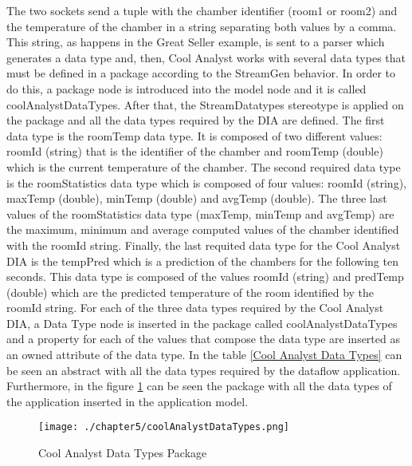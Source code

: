 The two sockets send a tuple with the chamber identifier (room1 or room2) and the temperature of the chamber in a string separating both values by a comma. This string, as happens in the Great Seller example, is sent to a parser which generates a data type and, then, Cool Analyst works with several data types that must be defined in a package according to the StreamGen behavior. In order to do this, a package node is introduced into the model node and it is called coolAnalystDataTypes. After that, the StreamDatatypes stereotype is applied on the package and all the data types required by the DIA are defined. The first data type is the roomTemp data type. It is composed of two different values: roomId (string) that is the identifier of the chamber and roomTemp (double) which is the current temperature of the chamber. The second required data type is the roomStatistics data type which is composed of four values: roomId (string), maxTemp (double), minTemp (double) and avgTemp (double). The three last values of the roomStatistics data type (maxTemp, minTemp and avgTemp) are the maximum, minimum and average computed values of the chamber identified with the roomId string. Finally, the last requited data type for the Cool Analyst DIA is the tempPred which is a prediction of the chambers for the following ten seconds. This data type is composed of the values roomId (string) and predTemp (double) which are the predicted temperature of the room identified by the roomId string. For each of the three data types required by the Cool Analyst DIA, a Data Type node is inserted in the package called coolAnalystDataTypes and a property for each of the values that compose the data type are inserted as an owned attribute of the data type. In the table \ref{Cool Analyst Data Types} can be seen an abstract with all the data types required by the dataflow application. Furthermore, in the figure \ref{fig:Cool Analyst Data Types Package} can be seen the package with all the data types of the application inserted in the application model.

\begin{figure}
\centering
{\texttt{[image: ./chapter5/coolAnalystDataTypes.png]}}
\caption{Cool Analyst Data Types Package}
\label{fig:Cool Analyst Data Types Package}
\end{figure}

